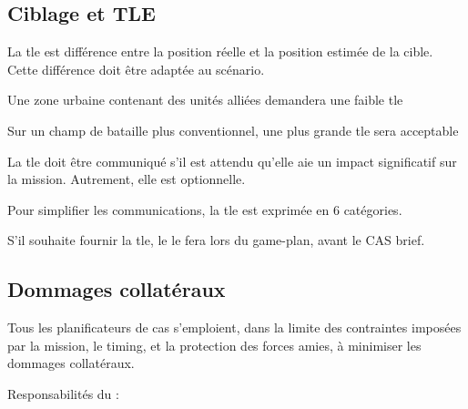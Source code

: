 \subsection{Ciblage et TLE}

\begin{e1}
	\item La \gls{tle} est différence entre la position réelle et la position estimée de la cible. Cette différence doit être adaptée au scénario.

	\begin{e2}
		\item Une zone urbaine contenant des unités alliées demandera une faible \gls{tle}
		\item Sur un champ de bataille plus conventionnel, une plus grande \gls{tle} sera acceptable
	\end{e2}
	
	\item La \gls{tle} doit être communiqué s'il est attendu qu'elle aie un impact significatif sur la mission. Autrement, elle est optionnelle.

	\item Pour simplifier les communications, la \gls{tle} est exprimée en 6 catégories.

	\begin{minipage}{\linewidth}
	

	
	\end{minipage}
	
	\item S'il souhaite fournir la \gls{tle}, le \ja{} le fera lors du game-plan, avant le CAS brief.
\end{e1}

\subsection{Dommages collatéraux}

Tous les planificateurs de \gls{cas} s'emploient, dans la limite des contraintes imposées par la mission, le timing, et la protection des forces amies, à minimiser les dommages collatéraux.

Responsabilités du \ja{}:

